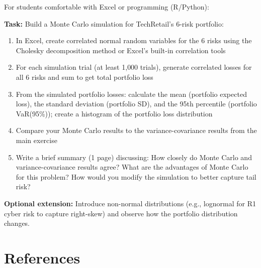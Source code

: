 \documentclass[11pt,openany]{book}
\providecommand{\tightlist}{\setlength{\itemsep}{0pt}\setlength{\parskip}{0pt}}
\begin{document}
For students comfortable with Excel or programming (R/Python):

\textbf{Task:} Build a Monte Carlo simulation for TechRetail's 6-risk
portfolio:

\begin{enumerate}\tightlist
  \item In Excel, create correlated normal random variables for the 6 risks
        using the Cholesky decomposition method or Excel's built-in
        correlation tools
  \item For each simulation trial (at least 1{,}000 trials), generate
        correlated losses for all 6 risks and sum to get total portfolio loss
  \item From the simulated portfolio losses: calculate the mean (portfolio
        expected loss), the standard deviation (portfolio SD), and the 95th
        percentile (portfolio VaR(95\%)); create a histogram of the portfolio
        loss distribution
  \item Compare your Monte Carlo results to the variance-covariance results
        from the main exercise
  \item Write a brief summary (1 page) discussing: How closely do Monte Carlo
        and variance-covariance results agree? What are the advantages of
        Monte Carlo for this problem? How would you modify the simulation to
        better capture tail risk?
\end{enumerate}

\textbf{Optional extension:} Introduce non-normal distributions (e.g.,
lognormal for R1 cyber risk to capture right-skew) and observe how the
portfolio distribution changes.

\section*{References}
\begingroup
\sloppy
\end{document}
